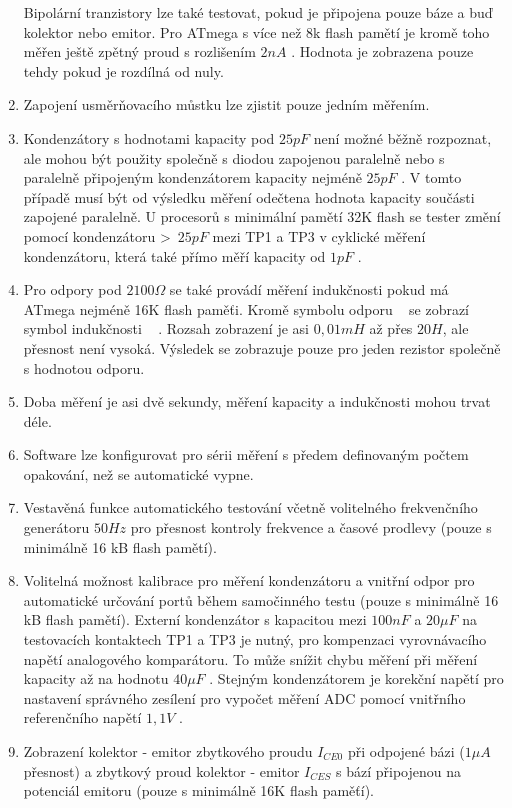 \begin{enumerate}
Bipolární tranzistory lze také testovat, pokud je připojena pouze báze a buď kolektor nebo emitor.
Pro ATmega s více než 8k flash pamětí je kromě toho měřen ještě zpětný proud s rozlišením \(2nA\) .
Hodnota je zobrazena pouze tehdy pokud je rozdílná od nuly.
\item Zapojení usměrňovacího můstku lze zjistit pouze jedním měřením.
\item Kondenzátory s hodnotami kapacity pod \(25pF\) není možné běžně rozpoznat, 
ale mohou být použity společně s diodou zapojenou paralelně nebo s paralelně připojeným kondenzátorem
kapacity nejméně \(25pF\) .
V tomto případě musí být od výsledku měření odečtena hodnota kapacity součásti zapojené paralelně.
U procesorů s minimální pamětí 32K flash se tester změní pomocí kondenzátoru \textgreater~\(25pF\)
mezi TP1 a TP3 v cyklické měření kondenzátoru, která také přímo měří kapacity od \(1pF\) .
\item Pro odpory pod \(2100\Omega\) se také provádí měření indukčnosti pokud
má ATmega nejméně 16K flash paměťi.
Kromě symbolu odporu \mbox{~\electricR} se zobrazí symbol indukčnosti \mbox{~\electricL} .
Rozsah zobrazení je asi \(0,01mH\) až přes \(20H\), ale přesnost není vysoká.
Výsledek se zobrazuje pouze pro jeden rezistor společně s hodnotou odporu.
\item Doba měření je asi dvě sekundy, měření kapacity a indukčnosti mohou trvat déle.
\item Software lze konfigurovat pro sérii měření s předem definovaným počtem opakování, než se automatické vypne.
\item Vestavěná funkce automatického testování včetně volitelného frekvenčního generátoru \(50Hz\)  pro přesnost kontroly frekvence
a časové prodlevy (pouze s minimálně 16 kB flash pamětí).
\item Volitelná možnost kalibrace pro měření kondenzátoru a vnitřní odpor pro
automatické určování portů během samočinného testu (pouze s minimálně 16 kB flash pamětí).
Externí kondenzátor s kapacitou mezi \(100nF\) a \(20\mu F\) na testovacích kontaktech TP1 a TP3 je nutný, 
pro kompenzaci vyrovnávacího napětí analogového komparátoru.
To může snížit chybu měření při měření kapacity až na hodnotu \(40\mu F\) .
Stejným kondenzátorem je korekční napětí pro nastavení správného zesílení pro
vypočet měření ADC pomocí vnitřního referenčního napětí \(1,1V\) .
\item Zobrazení kolektor - emitor zbytkového proudu \(I_{CE0}\) při odpojené bázi (\(1\mu A\) přesnost) 
a zbytkový proud kolektor - emitor  \(I_{CES}\) s bází připojenou na potenciál emitoru (pouze s minimálně 16K flash paměťí).

\end{enumerate}
